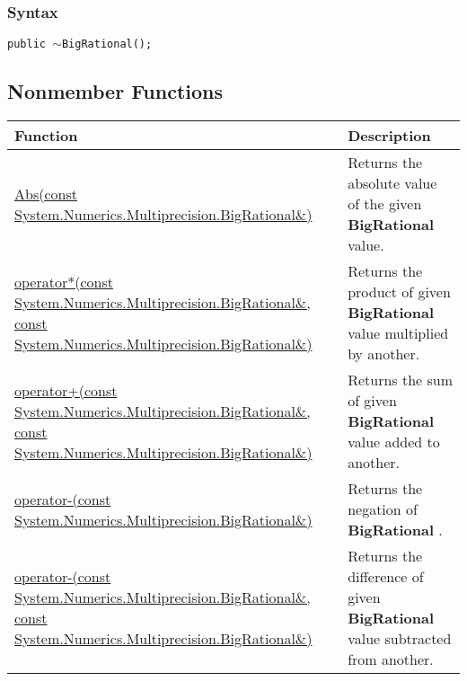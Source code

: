 \documentclass[a4paper,oneside,11.000000pt]{book}
\begin{document}
\subsubsection*{Syntax}\texttt{public $\sim$BigRational();}

\subsection{Nonmember Functions}
\begin{flushleft}
\begin{supertabular}[l]{!{\raggedright}p{7.575cm}!{\raggedright}p{7.575cm}}
\textbf{Function}
& \textbf{Description}
\\
\hline
\hyperlink{System.Numerics.Multiprecision.Abs.C.R.System.Numerics.Multiprecision.BigRational}{Abs(const System.\-Numerics.\-Multiprecision.\-BigRational\&\-)}
& Returns the absolute value of the given \textbf{BigRational}
 value.

\\
\hyperlink{System.Numerics.Multiprecision.operator.times.C.R.System.Numerics.Multiprecision.BigRational.C.R.System.Numerics.Multiprecision.BigRational}{operator*(const System.\-Numerics.\-Multiprecision.\-BigRational\&\-, const System.\-Numerics.\-Multiprecision.\-BigRational\&\-)}
& Returns the product of given \textbf{BigRational}
 value multiplied by another.

\\
\hyperlink{System.Numerics.Multiprecision.operator.plus.C.R.System.Numerics.Multiprecision.BigRational.C.R.System.Numerics.Multiprecision.BigRational}{operator+(const System.\-Numerics.\-Multiprecision.\-BigRational\&\-, const System.\-Numerics.\-Multiprecision.\-BigRational\&\-)}
& Returns the sum of given \textbf{BigRational}
 value added to another.

\\
\hyperlink{System.Numerics.Multiprecision.operator.minus.C.R.System.Numerics.Multiprecision.BigRational}{operator-(const System.\-Numerics.\-Multiprecision.\-BigRational\&\-)}
& Returns the negation of \textbf{BigRational}
.

\\
\hyperlink{System.Numerics.Multiprecision.operator.minus.C.R.System.Numerics.Multiprecision.BigRational.C.R.System.Numerics.Multiprecision.BigRational}{operator-(const System.\-Numerics.\-Multiprecision.\-BigRational\&\-, const System.\-Numerics.\-Multiprecision.\-BigRational\&\-)}
& Returns the difference of given \textbf{BigRational}
 value subtracted from another.


\end{supertabular}
\end{flushleft}
\end{document}
